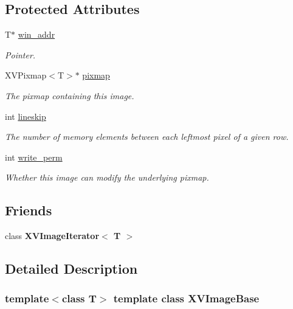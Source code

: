 \subsection*{Protected Attributes}
\begin{CompactItemize}
\item 
T$\ast$ \hyperlink{class_XVImageBase_n0}{win\_\-addr}
\begin{CompactList}\small\item\em Pointer.\item\end{CompactList}\item 
XVPixmap$<$T$>$$\ast$ \hyperlink{class_XVImageBase_n1}{pixmap}
\begin{CompactList}\small\item\em The pixmap containing this image.\item\end{CompactList}\item 
int \hyperlink{class_XVImageBase_n2}{lineskip}
\begin{CompactList}\small\item\em The number of memory elements between each leftmost pixel of a given row.\item\end{CompactList}\item 
int \hyperlink{class_XVImageBase_n3}{write\_\-perm}
\begin{CompactList}\small\item\em Whether this image can modify the underlying pixmap.\item\end{CompactList}\end{CompactItemize}
\subsection*{Friends}
\begin{CompactItemize}
\item 
class {\bf XVImage\-Iterator$<$ T $>$}
\end{CompactItemize}


\subsection{Detailed Description}
\subsubsection*{template$<$class T$>$  template class XVImage\-Base}

